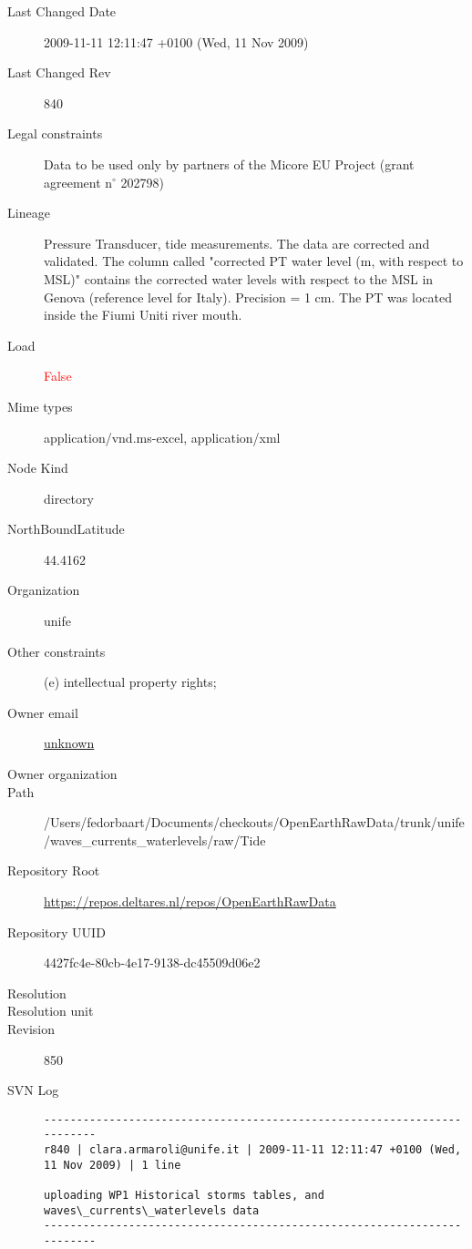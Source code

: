 \documentclass[9]{report}
\begin{document}
\begin{description}
  \item[Last Changed Date] 2009-11-11 12:11:47 +0100 (Wed, 11 Nov 2009)
  \item[Last Changed Rev] 840
  \item[Legal constraints] Data to be used only by partners of the Micore EU Project (grant agreement n\mbox{$^\circ$} 202798)
  \item[Lineage] Pressure Transducer, tide measurements. The data are corrected and validated. The column called "corrected PT water level (m, with respect to MSL)" contains the corrected water levels with respect to the MSL in Genova (reference level for Italy). Precision = 1 cm. The PT was located inside the Fiumi Uniti river mouth.
  \item[Load] \textcolor{red}{False}
  \item[Mime types] application/vnd.ms-excel, application/xml
  \item[Node Kind] directory
  \item[NorthBoundLatitude] 44.4162
  \item[Organization] unife
  \item[Other constraints] (e) intellectual property rights;
  \item[Owner email] \href{mailto:unknown}{unknown}
  \item[Owner organization] 
  \item[Path] /Users/fedorbaart/Documents/checkouts/OpenEarthRawData/trunk/unife/waves\_currents\_waterlevels/raw/Tide
  \item[Repository Root] \href{https://repos.deltares.nl/repos/OpenEarthRawData}{https://repos.deltares.nl/repos/OpenEarthRawData}
  \item[Repository UUID] 4427fc4e-80cb-4e17-9138-dc45509d06e2
  \item[Resolution] 
  \item[Resolution unit] 
  \item[Revision] 850
  \item[SVN Log] \begin{verbatim}
------------------------------------------------------------------------
r840 | clara.armaroli@unife.it | 2009-11-11 12:11:47 +0100 (Wed, 11 Nov 2009) | 1 line

uploading WP1 Historical storms tables, and waves\_currents\_waterlevels data
------------------------------------------------------------------------


\end{verbatim}
\end{description}
\end{document}
